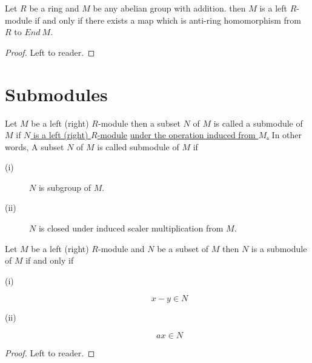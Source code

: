 \begin{thm}
	Let $R$ be a ring and $M$ be any abelian group with addition. then $M$ is a left $R$-module if and only if there exists a map which is anti-ring homomorphism from $R$ to $End \ M$.
\end{thm}
\begin{proof}
	Left to reader.
\end{proof}
\bigskip
\section{Submodules}
\begin{definition}[SubModule]
	Let $M$ be a left (right) $R$-module then a subset $N$ of $M$ is called a submodule of $M$ if \underline{$N$ is a left (right) $R$-module} \underline{under the operation induced from $M$.}\newline \bigskip
	In other words, A subset $N$ of $M$ is called submodule of $M$ if
	\begin{description}
		\item[(i)] $N$ is subgroup of $M$.
		\item[(ii)] $N$ is closed under induced scaler multiplication from $M$.
	\end{description}
\end{definition}
\bigskip
\begin{thm}
	Let $M$ be a left (right) $R$-module and $N$ be a subset of $M$ then $N$ is a submodule of $M$ if and only if
	\begin{description}
		\item[(i)]
		\marginnote[2.5em]{\[ \forall \ x , y  \in N \] } \[ x-y \in N \]
		\item[(ii)]
		\marginnote[2.5em]{\[ \forall \ a \in R \ \&\ x \in N \]} \[ a x \in N \]
	\end{description}
\end{thm}
\begin{proof}
	Left to reader.
\end{proof}
\bigskip
